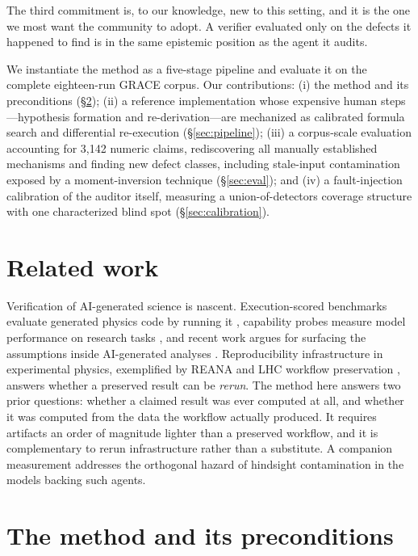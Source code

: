 \documentclass{article}
\begin{document}
The third commitment is, to our knowledge, new to this setting, and it is the one we most want the community to adopt. A verifier evaluated only on the defects it happened to find is in the same epistemic position as the agent it audits.

We instantiate the method as a five-stage pipeline and evaluate it on the complete eighteen-run GRACE corpus. Our contributions: (i) the method and its preconditions (\S\ref{sec:method}); (ii) a reference implementation whose expensive human steps---hypothesis formation and re-derivation---are mechanized as calibrated formula search and differential re-execution (\S\ref{sec:pipeline}); (iii) a corpus-scale evaluation accounting for 3{,}142 numeric claims, rediscovering all manually established mechanisms and finding new defect classes, including stale-input contamination exposed by a moment-inversion technique (\S\ref{sec:eval}); and (iv) a fault-injection calibration of the auditor itself, measuring a union-of-detectors coverage structure with one characterized blind spot (\S\ref{sec:calibration}).

\section{Related work}

Verification of AI-generated science is nascent. Execution-scored benchmarks evaluate generated physics code by running it \citep{phitsbench}, capability probes measure model performance on research tasks \citep{prlbench}, and recent work argues for surfacing the assumptions inside AI-generated analyses \citep{hammad2026}. Reproducibility infrastructure in experimental physics, exemplified by REANA and LHC workflow preservation \citep{reana}, answers whether a preserved result can be \emph{rerun}. The method here answers two prior questions: whether a claimed result was ever computed at all, and whether it was computed from the data the workflow actually produced. It requires artifacts an order of magnitude lighter than a preserved workflow, and it is complementary to rerun infrastructure rather than a substitute. A companion measurement addresses the orthogonal hazard of hindsight contamination in the models backing such agents.

\section{The method and its preconditions}
\label{sec:method}
\end{document}
